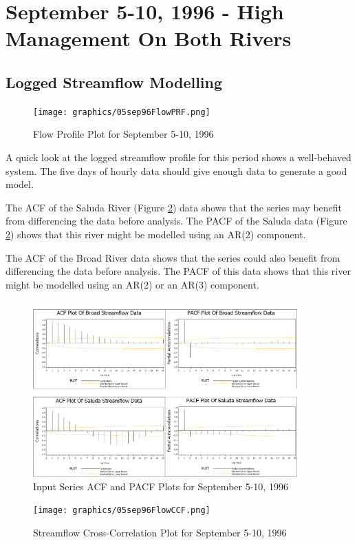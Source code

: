 \documentclass[12pt]{report}
\begin{document}
\section{September 5-10, 1996 - High Management On Both Rivers}
\subsection{Logged Streamflow Modelling}
\begin{figure}\label{fig:sepfl510}
\centering\texttt{[image: graphics/05sep96FlowPRF.png]}
\centering\caption{Flow Profile Plot for September 5-10, 1996}
\end{figure}

A quick look at the logged streamflow profile for this period
shows a well-behaved system.  The five days of hourly data should
give enough data to generate a good model.

The ACF of the Saluda River (Figure \ref{fig:sepflowacf}) data
shows that the series may benefit from differencing the data
before analysis. The PACF of the Saluda data (Figure
\ref{fig:sepflowacf})
 shows that this river might be modelled using an AR(2) component.

The ACF of the Broad River data shows that the series could also
benefit from differencing the data before analysis. The PACF of
this data shows that this river might be modelled using an AR(2)
or an AR(3) component.
\begin{figure}[h]
\centering\includegraphics[width=4in]{prodgraph/05sepinputdiag.png}
\centering\caption{Input Series ACF and PACF Plots for September
5-10, 1996}\label{fig:sepflowacf}
\end{figure}

\begin{figure}[h]
\centering\texttt{[image: graphics/05sep96FlowCCF.png]}
\centering\caption{Streamflow Cross-Correlation Plot for September
5-10, 1996}\label{fig:sepccf}
\end{figure}
\end{document}

